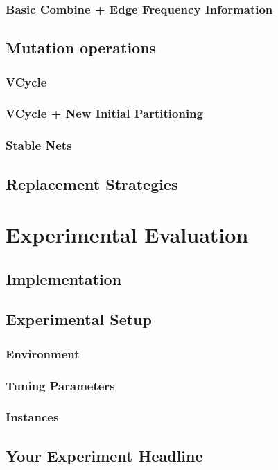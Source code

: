 \documentclass[a4paper,12pt,bibtotoc,titlepage, liststotoc,BCOR7mm,headsepline,pointlessnumbers]{scrbook}
\numberwithin{equation}{section}
\begin{document}
\subsection{Basic Combine + Edge Frequency Information}
\section{Mutation operations}
\subsection{VCycle}
\subsection{VCycle + New Initial Partitioning}
\subsection{Stable Nets}
\section{Replacement Strategies}
\chapter{Experimental Evaluation}
\section{Implementation}
\section{Experimental Setup}
\subsection{Environment}
\subsection{Tuning Parameters}
\subsection{Instances}
\section{Your Experiment Headline}
\end{document}
